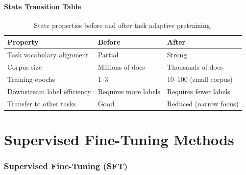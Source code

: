 \subsection{State Transition Table}
\begin{table}[h]\centering
\begin{tabular}{lll}\toprule
\textbf{Property} & \textbf{Before} & \textbf{After}\\\midrule
Task vocabulary alignment & Partial & Strong\\
Corpus size & Millions of docs & Thousands of docs\\
Training epochs & 1--3 & 10--100 (small corpus)\\
Downstream label efficiency & Requires more labels & Requires fewer labels\\
Transfer to other tasks & Good & Reduced (narrow focus)\\\bottomrule
\end{tabular}
\caption{State properties before and after task adaptive pretraining.}
\end{table}

\newpage
\part{Supervised Fine-Tuning Methods}

\section{Supervised Fine-Tuning (SFT)}

